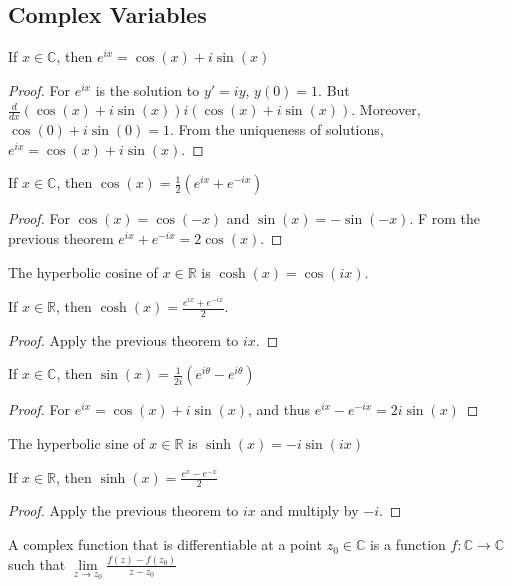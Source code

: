 \documentclass[crop=false,class=book]{standalone}
\begin{document}
\subsection{Complex Variables}
\begin{theorem}
If $x\in\mathbb{C}$, then $e^{ix}=\cos(x)+i\sin(x)$
\end{theorem}
\begin{proof}
For $e^{ix}$ is the solution to $y'=iy$, $y(0)=1$. But $\frac{d}{dx}(\cos(x)+i\sin(x))i(\cos(x)+i\sin(x))$. Moreover, $\cos(0)+i\sin(0)=1$. From the uniqueness of solutions, $e^{ix}=\cos(x)+i\sin(x)$. 
\end{proof}
\begin{theorem}
If $x\in \mathbb{C}$, then $\cos(x)=\frac{1}{2}(e^{ix}+e^{-ix})$
\end{theorem}
\begin{proof}
For $\cos(x)=\cos(-x)$ and $\sin(x)=-\sin(-x)$. F rom the previous theorem $e^{ix}+e^{-ix} = 2\cos(x)$.
\end{proof}
\begin{definition}
The hyperbolic cosine of $x\in \mathbb{R}$ is $\cosh(x)=\cos(ix)$.
\end{definition}
\begin{theorem}
If $x\in\mathbb{R}$, then $\cosh(x)=\frac{e^{ix}+e^{-ix}}{2}$.
\end{theorem}
\begin{proof}
Apply the previous theorem to $ix$.
\end{proof}
\begin{theorem}
If $x\in\mathbb{C}$, then $\sin(x)=\frac{1}{2i}(e^{i\theta}-e^{i\theta})$
\end{theorem}
\begin{proof}
For $e^{ix} = \cos(x)+i\sin(x)$, and thus $e^{ix}-e^{-ix}=2i\sin(x)$
\end{proof}
\begin{definition}
The hyperbolic sine of $x\in\mathbb{R}$ is $\sinh(x)=-i\sin(ix)$
\end{definition}
\begin{theorem}
If $x\in\mathbb{R}$, then $\sinh(x)=\frac{e^{x}-e^{-x}}{2}$
\end{theorem}
\begin{proof}
Apply the previous theorem to $ix$ and multiply by $-i$.
\end{proof}
\begin{definition}
A complex function that is differentiable at a point $z_{0}\in\mathbb{C}$ is a function $f:\mathbb{C}\rightarrow\mathbb{C}$ such that $\underset{z\rightarrow z_{0}}{\lim}\frac{f(z)-f(z_{0})}{z-z_{0}}$
\end{definition}
\end{document}

